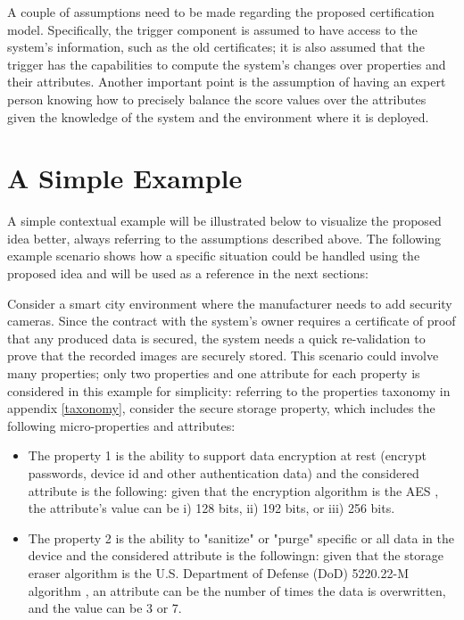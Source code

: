 A couple of assumptions need to be made regarding the proposed certification model. Specifically, the trigger component is assumed to have access to the system's information, such as the old certificates; it is also assumed that the trigger has the capabilities to compute the system's changes over properties and their attributes. Another important point is the assumption of having an expert person knowing how to precisely balance the score values over the attributes given the knowledge of the system and the environment where it is deployed.



\section{A Simple Example}
A simple contextual example will be illustrated below to visualize the proposed idea better, always referring to the assumptions described above. The following example scenario shows how a specific situation could be handled using the proposed idea and will be used as a reference in the next sections:

Consider a smart city environment where the manufacturer needs to add security cameras. Since the contract with the system's owner requires a certificate of proof that any produced data is secured, the system needs a quick re-validation to prove that the recorded images are securely stored. This scenario could involve many properties; only two properties and one attribute for each property is considered in this example for simplicity: referring to the properties taxonomy in appendix \ref{taxonomy}, consider the secure storage property, which includes the following micro-properties and attributes:

\begin{itemize}
    \item The property 1 is the ability to support data encryption at rest (encrypt passwords, device id and other authentication data) and the considered attribute is the following: given that the encryption algorithm is the AES \cite{daemen1999aes}, the attribute's value can be i) 128 bits, ii) 192 bits, or iii) 256 bits.
    
    \item The property 2 is the ability to "sanitize" or "purge" specific or all data in the device and the considered attribute is the followingn: given that the storage eraser algorithm is the U.S. Department of Defense (DoD) 5220.22-M algorithm \cite{fischer2017dod}, an attribute can be the number of times the data is overwritten, and the value can be 3 or 7.
\end{itemize}


